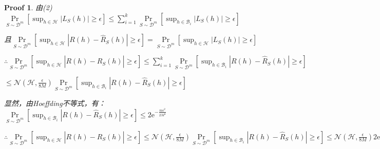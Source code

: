 \documentclass[a4paper,UTF8]{article}
\numberwithin{equation}{section}
\newtheorem*{myProof}{Proof}
\begin{document}
\begin{myProof}
		由(2)$\mathop{\text{Pr}} \limits_{S \sim \mathcal{D}^m} \left[ \sup_{h \in \mathcal{H}} \left| L_S(h) \right| \geqslant \epsilon \right] 
		\leqslant \sum_{i=1}^k \mathop{\text{Pr}} \limits_{S \sim \mathcal{D}^m} \left[ \sup_{h \in \mathcal{B}_i} \left| L_S(h) \right| \geqslant \epsilon \right]$
		
		且$\mathop{\text{Pr}} \limits_{S \sim \mathcal{D}^m} \left[ \sup_{h \in \mathcal{H}} \left| R(h) - \hat{R}_S(h) \right| \geqslant \epsilon \right] = \mathop{\text{Pr}} \limits_{S \sim \mathcal{D}^m} \left[ \sup_{h \in \mathcal{H}} \left| L_S(h) \right| \geqslant \epsilon \right] $
		
		$\therefore \mathop{\text{Pr}} \limits_{S \sim \mathcal{D}^m} \left[ \sup_{h \in \mathcal{H}} \left| R(h) - \hat{R}_S(h) \right| \geqslant \epsilon \right] \leq \sum_{i=1}^k \mathop{\text{Pr}} \limits_{S \sim \mathcal{D}^m} \left[ \sup_{h \in \mathcal{B}_i} \left| R(h) - \hat{R}_S(h) \right| \geqslant \epsilon \right]$
		
		$\leq  \mathcal{N} \left( \mathcal{H} , \frac{\epsilon}{8M} \right) \mathop{\text{Pr}} \limits_{S \sim \mathcal{D}^m} \left[ \sup_{h \in \mathcal{B}_i} \left| R(h) - \hat{R}_S(h) \right| \geqslant \epsilon \right]$
		
		显然，由Hoeffding不等式，有：$\mathop{\text{Pr}} \limits_{S \sim \mathcal{D}^m} \left[ \sup_{h \in \mathcal{B}_i} \left| R(h) - \hat{R}_S(h) \right| \geqslant \epsilon \right] \leq  2 \mathrm{e}^{ - \frac{m\epsilon^2}{2M^4} }$
		
		$\therefore \mathop{\text{Pr}} \limits_{S \sim \mathcal{D}^m} \left[ \sup_{h \in \mathcal{H}} \left| R(h) - \hat{R}_S(h) \right| \geqslant \epsilon \right] \leq \mathcal{N} \left( \mathcal{H} , \frac{\epsilon}{8M} \right) \mathop{\text{Pr}} \limits_{S \sim \mathcal{D}^m} \left[ \sup_{h \in \mathcal{B}_i} \left| R(h) - \hat{R}_S(h) \right| \geqslant \epsilon \right] \leq \mathcal{N} \left( \mathcal{H} , \frac{\epsilon}{8M} \right) 2 \mathrm{e}^{ - \frac{m\epsilon^2}{2M^4} }$
		
		
		
		
		
		
		
	\end{myProof}
	
\end{document}
